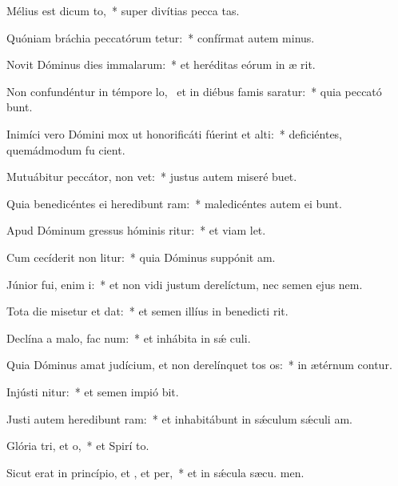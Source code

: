 \item Mélius est dicum to,~* super divítias pecca tas.
\item Quóniam bráchia peccatórum tetur:~* confírmat autem  minus.
\item Novit Dóminus dies immalarum:~* et heréditas eórum in æ rit.
\item Non confundéntur in témpore lo,~\pscross{} et in diébus famis saratur:~* quia peccató bunt.
\item Inimíci vero Dómini mox ut honorificáti fúerint et alti:~* deficiéntes, quemádmodum fu cient.
\item Mutuábitur peccátor,  non vet:~* justus autem miseré  buet.
\item Quia benedicéntes ei heredibunt ram:~* maledicéntes autem ei bunt.
\item Apud Dóminum gressus hóminis ritur:~* et viam  let.
\item Cum cecíderit non litur:~* quia Dóminus suppónit  am.
\item Júnior fui, enim i:~* et non vidi justum derelíctum, nec semen ejus  nem.
\item Tota die misetur et dat:~* et semen illíus in benedicti rit.
\item Declína a malo,  fac num:~* et inhábita in sǽ culi.
\item Quia Dóminus amat judícium, et non derelínquet tos os:~* in ætérnum contur.
\item Injústi nitur:~* et semen impió bit.
\item Justi autem heredibunt ram:~* et inhabitábunt in sǽculum sǽculi  am.
\item Glória tri, et o,~* et Spirí to.
\item Sicut erat in princípio, et , et per,~* et in sǽcula sæcu. men.
